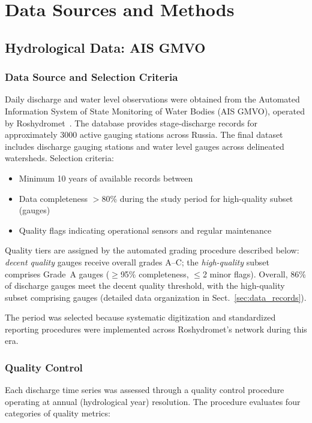 \section{Data Sources and Methods}
\label{sec:data_sources_methods}

\subsection{Hydrological Data: AIS GMVO}
\subsubsection{Data Source and Selection Criteria}
Daily discharge and water level observations were obtained from the Automated Information System of State Monitoring of Water Bodies (AIS GMVO), operated by Roshydromet~\citep{AIS_GMVO}.
The database provides stage-discharge records for approximately 3000 active gauging stations across Russia.
The final dataset includes \ndischarge discharge gauging stations and \nwaterlevel water level gauges across \ntotal delineated watersheds.
Selection criteria:
\begin{itemize}
    \item Minimum 10 years of available records between \years
    \item Data completeness $>$80\% during the study period for high-quality subset (\nhighquality gauges)
    \item Quality flags indicating operational sensors and regular maintenance
\end{itemize}

Quality tiers are assigned by the automated grading procedure described below: \emph{decent quality} gauges receive overall grades A--C; the \emph{high-quality} subset comprises Grade~A gauges ($\geq$95\% completeness, $\leq$2 minor flags).
Overall, 86\% of discharge gauges meet the decent quality threshold, with the high-quality subset comprising \nhighquality gauges (detailed data organization in Sect.~\ref{sec:data_records}).

The \years period was selected because systematic digitization and standardized reporting procedures were implemented across Roshydromet's network during this era.

\subsubsection{Quality Control}
Each discharge time series was assessed through a quality control procedure operating at annual (hydrological year) resolution.
The procedure evaluates four categories of quality metrics:

